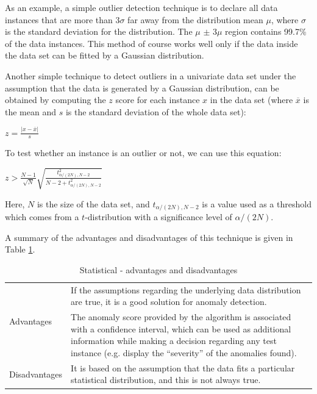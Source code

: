 \documentclass[12pt,a4paper,cucitura]{toptesi}
\begin{document}
As an example, a simple outlier detection technique is to declare all data instances that are more than $3\sigma$ far away from the distribution mean $\mu$, where $\sigma$ is the standard deviation for the distribution. 
The $\mu$ $\pm$ $3\mu$ region contains 99.7\% of the data instances.
This method of course works well only if the data inside the data set can be fitted by a Gaussian distribution.

Another simple technique to detect outliers in a univariate data set under the assumption that the data is generated by a Gaussian distribution, can be obtained by computing the $z$ score for each instance $x$ in the data set (where $\overline{x}$ is the mean and $s$ is the standard deviation of the whole data set):

\begin{center}
\Large
$z = \frac{|x-\overline{x}|}{s}$
\end{center}

To test whether an instance is an outlier or not, we can use this equation:

\begin{center}
\Large
$z > \frac{N - 1}{\sqrt{N}}\sqrt{\frac{t_{\alpha/(2N), N -2}^2}{N-2 + t_{\alpha/(2N), N -2}^2}}$
\end{center}

Here, $N$ is the size of the data set, and $t_{\alpha/(2N), N -2}$ is a value used as a threshold which comes from a $t$-distribution with a significance level of $\alpha/(2N)$.

A summary of the advantages and disadvantages of this technique is given in Table \ref{tab-statistic}.

\begin{table}[h]
\centering
\begin{tabular}{l|p{12cm}}
\hline
\hline
\multirow{2}{*}{Advantages} & If the assumptions regarding the underlying data distribution are true, it is a good solution for anomaly detection. \\
\cline{2-2}
& The anomaly score provided by the algorithm is associated with a confidence interval, which can be used as additional information while making a decision regarding any test instance (e.g. display the ``severity'' of the anomalies found). \\ 
\hline
\multirow{2}{*}{Disadvantages} & It is based on the assumption that the data fits a particular statistical distribution, and this is not always true. \\
\hline
\hline
\end{tabular}
\caption{Statistical - advantages and disadvantages}
\label{tab-statistic}
\end{table}
\end{document}
